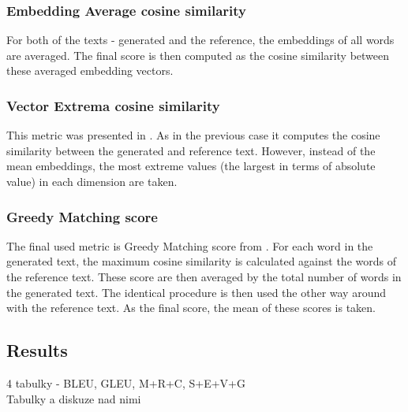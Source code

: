 \subsubsection*{Embedding Average cosine similarity}
For both of the texts - generated and the reference, the embeddings of all words are averaged. The final score is then computed as the cosine similarity between these averaged embedding vectors.

\subsubsection*{Vector Extrema cosine similarity}
This metric was presented in \citet{forgues2014bootstrapping}. As in the previous case it computes the cosine similarity between the generated and reference text. However, instead of the mean embeddings, the most extreme values (the largest in terms of absolute value) in each dimension are taken.

\subsubsection*{Greedy Matching score}
The final used metric is Greedy Matching score from \citet{rus2012optimal}. For each word in the generated text, the maximum cosine similarity is calculated against the words of the reference text. These score are then averaged by the total number of words in the generated text. The identical procedure is then used the other way around with the reference text. As the final score, the mean of these scores is taken.

\subsection{Results}
4 tabulky - BLEU, GLEU, M+R+C, S+E+V+G\\
Tabulky a diskuze nad nimi

